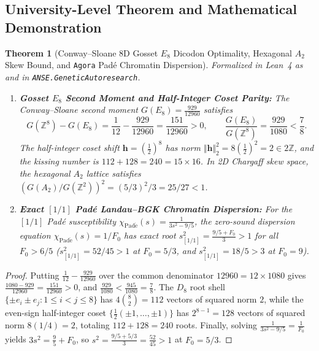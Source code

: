 \documentclass[11pt,a4paper]{article}
\newtheorem{theorem}{Theorem}[section]
\theoremstyle{definition}
\theoremstyle{remark}
\begin{document}
\subsection{University-Level Theorem and Mathematical Demonstration}

\begin{theorem}[Conway--Sloane 8D Gosset $E_8$ Dicodon Optimality, Hexagonal $A_2$ Skew Bound, and \texttt{Agora} Pad\'e Chromatin Dispersion]
\label{thm:sec9_e8_agora}
Formalized in Lean~4 as  and  in \texttt{ANSE.GeneticAutoresearch}.
\begin{enumerate}
  \item \textbf{Gosset $E_8$ Second Moment and Half-Integer Coset Parity:} The Conway--Sloane second moment $G(E_8) = \frac{929}{12960}$ satisfies
  \begin{equation}
    G(\mathbb{Z}^8) - G(E_8) = \frac{1}{12} - \frac{929}{12960} = \frac{151}{12960} > 0, \qquad \frac{G(E_8)}{G(\mathbb{Z}^8)} = \frac{929}{1080} < \frac{7}{8}.
  \end{equation}
  The half-integer coset shift $\mathbf{h} = (\frac{1}{2})^8$ has norm $\Vert\mathbf{h}\Vert_2^2 = 8(\frac{1}{2})^2 = 2 \in 2\mathbb{Z}$, and the kissing number is $112 + 128 = 240 = 15\times 16$. In 2D Chargaff skew space, the hexagonal $A_2$ lattice satisfies $(G(A_2)/G(\mathbb{Z}^2))^2 = (5/3)^2 / 3 = 25/27 < 1$.
  \item \textbf{Exact $[1/1]$ Pad\'e Landau--BGK Chromatin Dispersion:} For the $[1/1]$ Pad\'e susceptibility $\chi_{\mathrm{Pad\acute{e}}}(s) = \frac{1}{3s^2 - 9/5}$, the zero-sound dispersion equation $\chi_{\mathrm{Pad\acute{e}}}(s) = 1/F_0$ has exact root $s_{[1/1]}^2 = \frac{9/5 + F_0}{3} > 1$ for all $F_0 > 6/5$ ($s_{[1/1]}^2 = 52/45 > 1$ at $F_0 = 5/3$, and $s_{[1/1]}^2 = 18/5 > 3$ at $F_0 = 9$).
\end{enumerate}
\end{theorem}

\begin{proof}
Putting $\frac{1}{12} - \frac{929}{12960}$ over the common denominator $12960 = 12 \times 1080$ gives $\frac{1080 - 929}{12960} = \frac{151}{12960} > 0$, and $\frac{929}{1080} < \frac{945}{1080} = \frac{7}{8}$. The $D_8$ root shell $\{\pm e_i \pm e_j : 1 \le i < j \le 8\}$ has $4\binom{8}{2} = 112$ vectors of squared norm $2$, while the even-sign half-integer coset $\{\frac{1}{2}(\pm 1, \dots, \pm 1)\}$ has $2^{8-1} = 128$ vectors of squared norm $8(1/4) = 2$, totaling $112 + 128 = 240$ roots. Finally, solving $\frac{1}{3s^2 - 9/5} = \frac{1}{F_0}$ yields $3s^2 = \frac{9}{5} + F_0$, so $s^2 = \frac{9/5 + 5/3}{3} = \frac{52}{45} > 1$ at $F_0 = 5/3$.
\end{proof}
\end{document}
